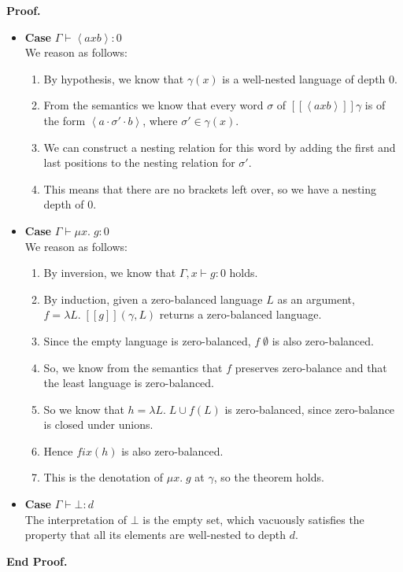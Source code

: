 \documentclass{article}
\newcommand{\fix}[2]{\mu {#1}.\;{#2}}
\newcommand{\lft}[1]{\left<{#1}\right.}
\newcommand{\rgt}[1]{\left.{#1}\right>}
\newcommand{\judgebalance}[3][\Gamma]{{#1} \vdash {#2} : {#3}}
\newcommand{\interp}[1]{[\![{#1}]\!]}
\newcommand{\fun}[2]{\lambda {#1}.\;{#2}}
\newenvironment{proof}{\noindent\textbf{Proof.}}{\noindent\textbf{End Proof.}}
\newenvironment{caseblock}{\begin{itemize}}{\end{itemize}}
\newenvironment{case}[1]{\item \textbf{Case} {#1}\\}{}
\begin{document}
\begin{proof}
\begin{caseblock}
  \begin{case}{$\judgebalance{\lft{a}x\rgt{b}}{0}$}
    We reason as follows: 
    \begin{enumerate}
      \item By hypothesis, we know that $\gamma(x)$ is a well-nested language of depth 0. 
      \item From the semantics we know that every word $\sigma$ of $\interp{\lft{a}x\rgt{b}}\gamma$ is 
        of the form $\lft{a}\cdot\sigma'\cdot\rgt{b}$, where $\sigma' \in \gamma(x)$. 
      \item We can construct a nesting relation for this word by adding the first and last positions 
        to the nesting relation for $\sigma'$. 
      \item This means that there are no brackets left over, so we have a nesting depth of 0. 
    \end{enumerate}
  \end{case}

  \begin{case}{$\judgebalance{\fix{x}{g}}{0}$}
    We reason as follows: 
    \begin{enumerate}
      \item By inversion, we know that $\judgebalance[\Gamma, x]{g}{0}$ holds. 
      \item By induction, given a zero-balanced language $L$ as an argument, $f = \fun{L}{\interp{g}(\gamma,L)}$
        returns a zero-balanced language. 
      \item Since the empty language is zero-balanced, $f\;\emptyset$ is
        also zero-balanced. 
      \item So, we know from the semantics that $f$ preserves zero-balance and that the least language is zero-balanced. 
      \item So we know that $h = \fun{L}{L \cup f(L)}$ is zero-balanced, since zero-balance is closed under unions. 
      \item Hence $\mathit{fix}(h)$ is also zero-balanced. 
      \item This is the denotation of $\fix{x}{g}$ at $\gamma$, so the theorem holds. 
    \end{enumerate}
  \end{case}

  \begin{case}{$\judgebalance{\bot}{d}$}
    The interpretation of $\bot$ is the empty set, which vacuously satisfies the property that
    all its elements are well-nested to depth $d$. 
  \end{case}


\end{caseblock}
\end{proof}
\end{document}
